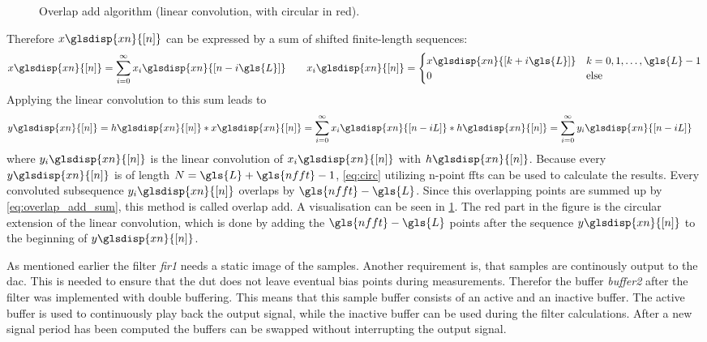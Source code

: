 \documentclass[12pt,a4paper,parskip=full,abstract=true,BCOR=12mm,twoside,open=right]{scrreprt}
\def\device#1{\textit{#1}}
\newcommand{\XN}{\glsdisp{xn}{[n]}}
\begin{document}
\begin{figure}[htb]
    \caption{Overlap add algorithm (linear convolution, with circular in red). }
    \label{fig:overlap_add}
\end{figure}
Therefore $x\XN$ can
be expressed by a sum of shifted finite-length sequences:
\begin{equation}
    \label{eq:sum_seq} x\XN = \sum_{i=0}^{\infty} x_i\glsdisp{xn}{[n-i\gls{L}]} \qquad x_i\XN =\begin{cases}
        x\glsdisp{xn}{[k+i\gls{L}]} & k = 0, 1, \ldots, \gls{L}-1\\
        0 & \text{else} \end{cases}
\end{equation}
Applying the linear convolution to this sum leads to
\begin{equation}
    \begin{split}\label{eq:overlap_add_sum}
        y\XN = h\XN * x\XN & = \sum_{i=0}^{\infty} x_i\glsdisp{xn}{[n-iL]} * h\XN = \sum_{i=0}^{\infty} y_i\glsdisp{xn}{[n-iL]}
    \end{split}
\end{equation}
where $y_i\XN$ is the linear convolution of $x_i\XN$ with $h\XN$. Because every $y\XN$ is of length
$N = \gls{L} + \gls{nfft} -1$, \cref{eq:circ} utilizing n-point \glspl{fft} can be used to calculate the results.
Every convoluted subsequence $y_i\XN$ overlaps by $\gls{nfft} - \gls{L}$. Since this overlapping
points are summed up by \cref{eq:overlap_add_sum}, this method is called overlap
add. A visualisation can be seen in \cref{fig:overlap_add}. The red part in the figure
is the circular extension of the linear convolution, which is done by adding the
$\gls{nfft} - \gls{L}$ points after the sequence $y\XN$ to the beginning of $y\XN$.

As mentioned earlier the filter \device{fir1} needs a static image of the samples.
Another requirement is, that samples are continously output to the \gls{dac}. This
is needed to ensure that the \gls{dut} does not leave eventual bias points during
measurements. Therefor the buffer \device{buffer2} after the filter was implemented
with double buffering. This means that this sample buffer consists of an active
and an inactive buffer. The active buffer is used to continuously play back the output
signal, while the inactive buffer can be used during the filter calculations. After
a new signal period has been computed the buffers can be swapped without interrupting
the output signal.
\end{document}
